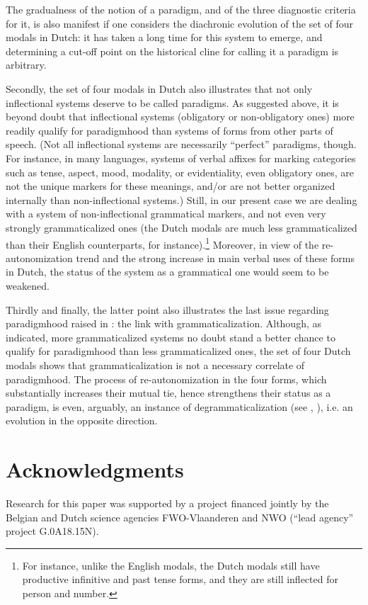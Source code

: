 \documentclass[output=paper]{langsci/langscibook}
\begin{document}
The gradualness of the notion of a paradigm, and of the three diagnostic criteria for it, is also manifest if one considers the diachronic evolution of the set of four modals in Dutch: it has taken a long time for this system to emerge, and determining a cut-off point on the historical cline for calling it a paradigm is arbitrary.

Secondly, the set of four modals in Dutch also illustrates that not only inflectional systems deserve to be called paradigms. As suggested above, it is beyond doubt that inflectional systems (obligatory or non-obligatory ones) more readily qualify for paradigmhood than systems of forms from other parts of speech. (Not all inflectional systems are necessarily “perfect” paradigms, though. For instance, in many languages, systems of verbal affixes for marking categories such as tense, aspect, mood, modality, or evidentiality, even obligatory ones, are not the unique markers for these meanings, and/or are not better organized internally than non-inflectional systems.) Still, in our present case we are dealing with a system of non-inflectional grammatical markers, and not even very strongly grammaticalized ones (the Dutch modals are much less grammaticalized than their English counterparts, for instance).\footnote{For instance, unlike the English modals, the Dutch modals still have productive infinitive and past tense forms, and they are still inflected for person and number.}  Moreover, in view of the re-autonomization trend and the strong increase in main verbal uses of these forms in Dutch, the status of the system as a grammatical one would seem to be weakened.

Thirdly and finally, the latter point also illustrates the last issue regarding paradigmhood raised in : the link with grammaticalization. Although, as indicated, more grammaticalized systems no doubt stand a better chance to qualify for paradigmhood than less grammaticalized ones, the set of four Dutch modals shows that grammaticalization is not a necessary correlate of paradigmhood. The process of re-autonomization in the four forms, which substantially increases their mutual tie, hence strengthens their status as a paradigm, is even, arguably, an instance of degrammaticalization (see \citealt{Nuyts2013}, \citealt{CaersNuyts2021}), i.e. an evolution in the opposite direction.

\section*{Acknowledgments}

Research for this paper was supported by a project financed jointly by the Belgian and Dutch science agencies FWO-Vlaanderen and NWO (“lead agency” project G.0A18.15N).

{\sloppy\printbibliography[heading=subbibliography,notkeyword=this]}
\end{document}
